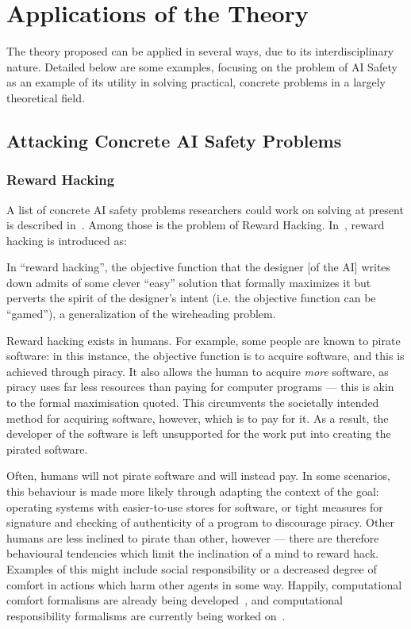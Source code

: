 \section{Applications of the Theory}
The theory proposed can be applied in several ways, due to its interdisciplinary nature. Detailed below are some examples, focusing on the problem of AI Safety as an example of its utility in solving practical, concrete problems in a largely theoretical field.\par

\subsection{Attacking Concrete AI Safety Problems}

\subsubsection{Reward Hacking}
A list of concrete AI safety problems researchers could work on solving at present is described in~\cite{concrete_problems}. Among those is the problem of Reward Hacking. In~\cite{concrete_problems}, reward hacking is introduced as:

\begin{displayquote}
In ``reward hacking'', the objective function that the designer [of the AI] writes down admits of some clever ``easy'' solution that formally maximizes it but perverts the spirit of the designer’s intent (i.e. the objective function can be ``gamed''), a generalization of the wireheading problem.
\end{displayquote}

Reward hacking exists in humans. For example, some people are known to pirate software: in this instance, the objective function is to acquire software, and this is achieved through piracy. It also allows the human to acquire \emph{more} software, as piracy uses far less resources than paying for computer programs --- this is akin to the formal maximisation quoted. This circumvents the societally intended method for acquiring software, however, which is to pay for it. As a result, the developer of the software is left unsupported for the work put into creating the pirated software.\par

Often, humans will not pirate software and will instead pay. In some scenarios, this behaviour is made more likely through adapting the context of the goal: operating systems with easier-to-use stores for software, or tight measures for signature and checking of authenticity of a program to discourage piracy. Other humans are less inclined to pirate than other, however --- there are therefore behavioural tendencies which limit the inclination of a mind to reward hack. Examples of this might include social responsibility or a decreased degree of comfort in actions which harm other agents in some way. Happily, computational comfort formalisms are already being developed~\citep{Marsh2011}, and computational responsibility formalisms are currently being worked on~\citep{wallis_responsibility}.\par

